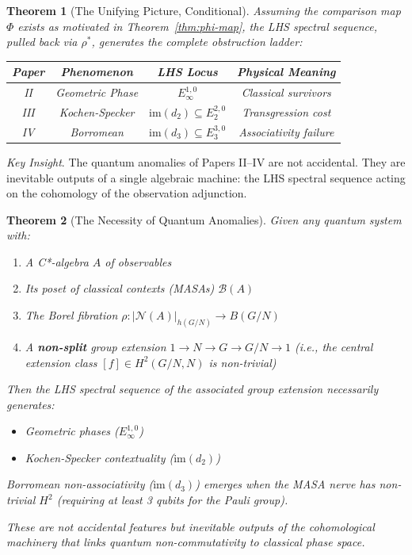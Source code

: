 \documentclass[11pt]{article}
\newtheorem{theorem}{Theorem}[section]
\begin{document}
\begin{theorem}[The Unifying Picture, Conditional]\label{thm:unifying}
Assuming the comparison map $\Phi$ exists as motivated in Theorem~\ref{thm:phi-map}, the LHS spectral sequence, pulled back via $\rho^*$, generates the complete obstruction ladder:

\begin{center}
\begin{tabular}{c|c|c|c}
\toprule
\textbf{Paper} & \textbf{Phenomenon} & \textbf{LHS Locus} & \textbf{Physical Meaning} \\
\midrule
II & Geometric Phase & $E_\infty^{1,0}$ & Classical survivors \\
III & Kochen-Specker & $\text{im}(d_2) \subseteq E_2^{2,0}$ & Transgression cost \\
IV & Borromean & $\text{im}(d_3) \subseteq E_3^{3,0}$ & Associativity failure \\
\bottomrule
\end{tabular}
\end{center}
\end{theorem}

\textit{Key Insight}.
The quantum anomalies of Papers II--IV are not accidental. They are inevitable outputs of a single algebraic machine: the LHS spectral sequence acting on the cohomology of the observation adjunction.

\begin{theorem}[The Necessity of Quantum Anomalies]\label{thm:necessity}
Given any quantum system with:
\begin{enumerate}
\item A C*-algebra $A$ of observables
\item Its poset of classical contexts (MASAs) $\mathcal{B}(A)$
\item The Borel fibration $\rho: |\mathcal{N}(A)|_{h(G/N)} \to B(G/N)$
\item A \textbf{non-split} group extension $1 \to N \to G \to G/N \to 1$ (i.e., the central extension class $[f] \in H^2(G/N, N)$ is non-trivial)
\end{enumerate}

Then the LHS spectral sequence of the associated group extension necessarily generates:
\begin{itemize}
\item Geometric phases ($E_\infty^{1,0}$)
\item Kochen-Specker contextuality ($\text{im}(d_2)$)
\end{itemize}
Borromean non-associativity ($\text{im}(d_3)$) emerges when the MASA nerve has non-trivial $H^2$ (requiring at least 3 qubits for the Pauli group).

These are not accidental features but inevitable outputs of the cohomological machinery that links quantum non-commutativity to classical phase space.
\end{theorem}
\end{document}
